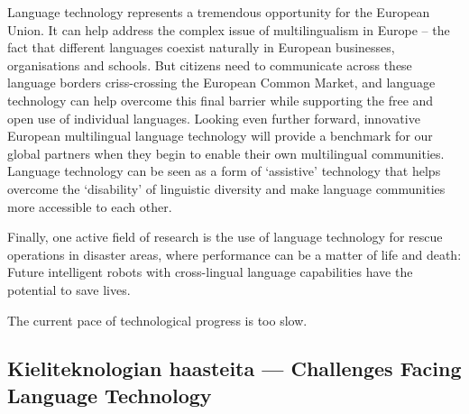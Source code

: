 \documentclass[]{../../metanetpaper}
\begin{document}
\begin{Parallel}[c]{70mm}{70mm}
{Language technology represents a tremendous opportunity for the European Union.
It can help address the complex issue of multilingualism in Europe – the fact
that different languages coexist naturally in European businesses,
organisations and schools. But citizens need to communicate across these
language borders criss-crossing the European Common Market, and language
technology can help overcome this final barrier while supporting the free and
open use of individual languages. Looking even further forward, innovative
European multilingual language technology will provide a benchmark for our
global partners when they begin to enable their own multilingual communities.
Language technology can be seen as a form of ‘assistive’ technology that helps
overcome the ‘disability’ of linguistic diversity and make language communities
more accessible to each other.

Finally, one active field of research is the use of language technology for
rescue operations in disaster areas, where performance can be a matter of life
and death: Future intelligent robots with cross-lingual language capabilities
have the potential to save lives.

The current pace of technological progress is too slow.
}

\ParallelPar

\subsection{Kieliteknologian haasteita --- Challenges Facing Language Technology}



\end{Parallel}
\end{document}
